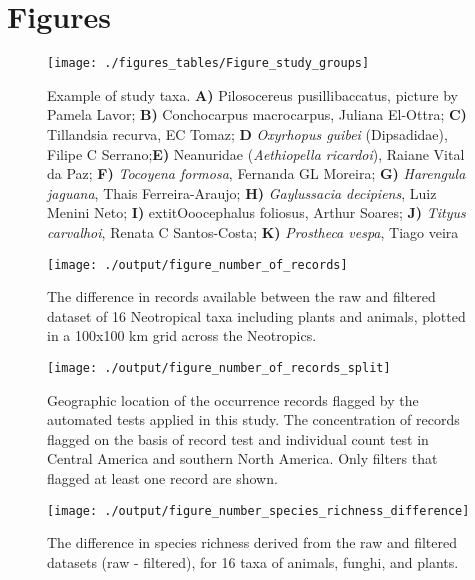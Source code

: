 \documentclass[fleqn,10pt,lineno]{wlpeerj} %
\begin{document}
\hypertarget{figures}{%
\section*{Figures}\label{figures}}

\begin{figure}
\texttt{[image: ./figures\_tables/Figure\_study\_groups]} \caption{Example of study taxa. \textbf{A)} Pilosocereus pusillibaccatus, picture by Pamela Lavor; \textbf{B)} Conchocarpus macrocarpus, Juliana El-Ottra; \textbf{C)} Tillandsia recurva, EC Tomaz; \textbf{D} \textit{Oxyrhopus guibei} (Dipsadidae), Filipe C Serrano;\textbf{E)} Neanuridae (\textit{Aethiopella ricardoi}), Raiane Vital da Paz; \textbf{F)} \textit{Tocoyena formosa}, Fernanda GL Moreira; \textbf{G)} \textit{Harengula jaguana}, Thais Ferreira-Araujo; \textbf{H)} \textit{Gaylussacia decipiens}, Luiz Menini Neto; \textbf{I)}  extit{Ooocephalus foliosus}, Arthur Soares; \textbf{J)} \textit{Tityus carvalhoi}, Renata C Santos-Costa; \textbf{K)} \textit{Prostheca vespa}, Tiago veira}\label{fig:species}
\end{figure}

\begin{figure}
\texttt{[image: ./output/figure\_number\_of\_records]} \caption{The difference in records available between the raw and filtered dataset of 16 Neotropical taxa including plants and animals, plotted in a 100x100 km grid across the Neotropics.}\label{fig:total}
\end{figure}

\begin{figure}
\texttt{[image: ./output/figure\_number\_of\_records\_split]} \caption{Geographic location of the occurrence records flagged by the automated tests  applied in this study. The concentration of records flagged on the basis of record test and individual count test in Central America and southern North America.  Only filters that flagged at least one record are shown.}\label{fig:split}
\end{figure}

\begin{figure}
\texttt{[image: ./output/figure\_number\_species\_richness\_difference]} \caption{The difference in species richness derived from the raw and filtered datasets (raw - filtered), for 16 taxa of animals, funghi, and plants.}\label{fig:speciesrichness}
\end{figure}
\end{document}
